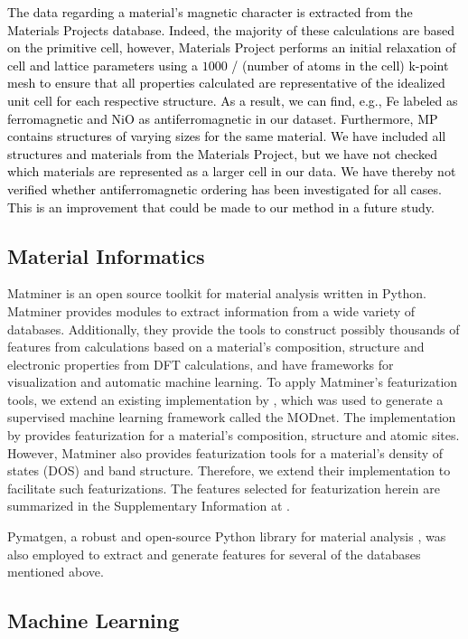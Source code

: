 \documentclass[superscriptaddress,unsortedaddress,
 amsmath,amssymb,
 aps,
]{revtex4-2}
\newcommand{\mrk}[1]{\textcolor{black}{#1}}
\begin{document}
\mrk{The data regarding a material's magnetic character is extracted from the Materials Projects database. Indeed, the majority of these calculations are based on the primitive cell, however, Materials Project performs an initial relaxation of cell and lattice parameters using a $1000$ / (number of atoms in the cell) k-point mesh to ensure that all properties calculated are representative of the idealized unit cell for each respective structure. As a result, we can find, e.g., Fe labeled as ferromagnetic and NiO as antiferromagnetic in our dataset. Furthermore, MP contains structures of varying sizes for the same material. We have included all structures and materials from the Materials Project, but we have not checked which materials are represented as a larger cell in our data. We have thereby not verified whether antiferromagnetic ordering has been investigated for all cases. This is an improvement that could be made to our method in a future study.} 

\subsection*{Material Informatics}  
Matminer \cite{Ward2018} is an open source toolkit for material analysis written in Python. Matminer provides modules to extract information from a wide variety of databases. Additionally, they provide the tools to construct possibly thousands of features from calculations based on a material's composition, structure and electronic properties from DFT calculations, and have frameworks for visualization and automatic machine learning. 
To apply Matminer's featurization tools, we extend an existing implementation by \citeauthor{Breuck2021} \cite{Breuck2021}, which was used to generate a supervised machine learning framework called the MODnet. The implementation by \citeauthor{Breuck2021} provides featurization for a material's composition, structure and atomic sites. However, Matminer also provides featurization tools for a material's density of states (DOS) and band structure. Therefore, we extend their implementation to facilitate such featurizations. The features selected for featurization herein are summarized in the Supplementary Information at \cite{supplementary}. 

Pymatgen, a robust and open-source Python library for material analysis \cite{pymatgen}, was also employed to extract and generate features for several of the databases mentioned above. 

\subsection*{Machine Learning} 
\end{document}
